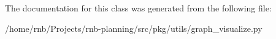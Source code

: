 The documentation for this class was generated from the following file\+:\begin{DoxyCompactItemize}
\item 
/home/rnb/\+Projects/rnb-\/planning/src/pkg/utils/graph\+\_\+visualize.\+py\end{DoxyCompactItemize}
